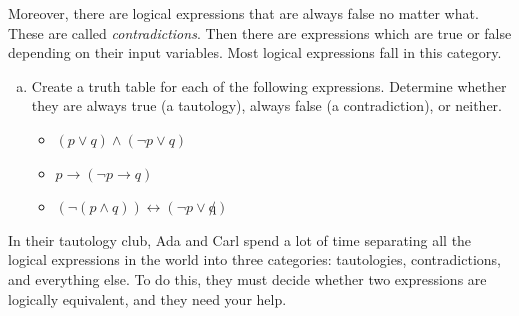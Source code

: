 \documentclass{article}
\begin{document}
Moreover, there are logical expressions that are always false
no matter what. These are called \emph{contradictions}.
Then there are expressions which are true or false
depending on their input variables. Most logical
expressions fall in this category.

\begin{enumerate}[(a)]
\item
Create a truth table for each of the following expressions.
Determine whether they are always true (a tautology),
always false (a contradiction), or neither.
\begin{itemize}
\item $(p \lor q) \land (\lnot p \lor q)$
\item $p \rightarrow (\lnot p \rightarrow q)$
\item $(\lnot (p \land q)) \leftrightarrow (\lnot p \lor \not q)$
\end{itemize}
\end{enumerate}

In their tautology club, Ada and Carl spend a lot of time separating
all the logical expressions in the world into three categories:
tautologies, contradictions, and everything else. To do this,
they must decide
whether two expressions are logically equivalent, and they need your help.
\end{document}
